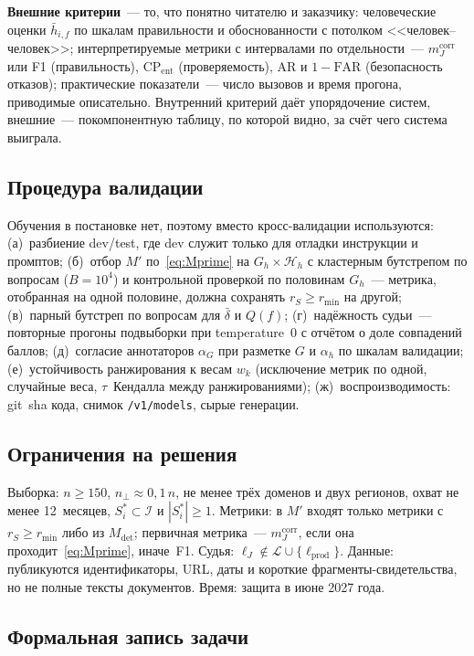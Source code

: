 \documentclass{article}
\newcommand{\Hh}{\mathcal{H}_{h}}
\newcommand{\Lm}{\mathcal{L}}
\newcommand{\lprod}{\ell_{\mathrm{prod}}}
\newcommand{\lJ}{\ell_{J}}
\newcommand{\refuse}{\bot}                          %
\newcommand{\CP}{\mathrm{CP}}
\newcommand{\AR}{\mathrm{AR}}
\newcommand{\FAR}{\mathrm{FAR}}
\newcommand{\mcorr}{m_J^{\mathrm{corr}}}
\newcommand{\rS}{r_{S}}
\newcommand{\rmin}{r_{\min}}
\newcommand{\Mdet}{M_{\mathrm{det}}}
\begin{document}
\textbf{Внешние критерии}~--- то, что понятно читателю и заказчику: человеческие оценки $\bar h_{i,f}$ по шкалам правильности и обоснованности с потолком <<человек--человек>>; интерпретируемые метрики с интервалами по отдельности~--- $\mcorr$ или F1 (правильность), $\CP_{\mathrm{ent}}$ (проверяемость), $\AR$ и $1-\FAR$ (безопасность отказов); практические показатели~--- число вызовов и время прогона, приводимые описательно. Внутренний критерий даёт упорядочение систем, внешние~--- покомпонентную таблицу, по которой видно, за счёт чего система выиграла.

\subsection{Процедура валидации}

Обучения в постановке нет, поэтому вместо кросс-валидации используются: (а)~разбиение dev/test, где dev служит только для отладки инструкции и промптов; (б)~отбор $M'$ по~\eqref{eq:Mprime} на $G_h\times\Hh$ с кластерным бутстрепом по вопросам ($B=10^4$) и контрольной проверкой по половинам $G_h$~--- метрика, отобранная на одной половине, должна сохранять $\rS\ge\rmin$ на другой; (в)~парный бутстреп по вопросам для $\bar\delta$ и $Q(f)$; (г)~надёжность судьи~--- повторные прогоны подвыборки при temperature~$0$ с отчётом о доле совпадений баллов; (д)~согласие аннотаторов $\alpha_G$ при разметке $G$ и $\alpha_h$ по шкалам валидации; (е)~устойчивость ранжирования к весам $w_k$ (исключение метрик по одной, случайные веса, $\tau$~Кендалла между ранжированиями); (ж)~воспроизводимость: git~sha кода, снимок \texttt{/v1/models}, сырые генерации.

\subsection{Ограничения на решения}

Выборка: $n\ge150$, $n_{\refuse}\approx0{,}1\,n$, не менее трёх доменов и двух регионов, охват не менее 12~месяцев, $S^*_i\subset\mathcal{I}$ и $|S^*_i|\ge1$. Метрики: в $M'$ входят только метрики с $\rS\ge\rmin$ либо из $\Mdet$; первичная метрика~--- $\mcorr$, если она проходит~\eqref{eq:Mprime}, иначе~F1. Судья: $\lJ\notin\Lm\cup\{\lprod\}$. Данные: публикуются идентификаторы, URL, даты и короткие фрагменты-свидетельства, но не полные тексты документов. Время: защита в июне 2027 года.

\subsection{Формальная запись задачи}
\end{document}
